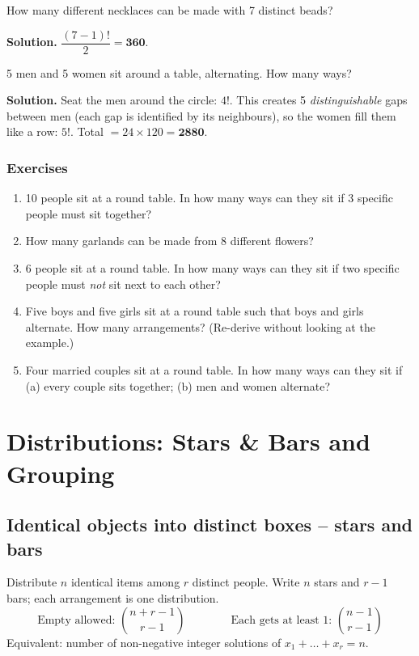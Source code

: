 \documentclass[11pt,a4paper,openany]{report}
\newenvironment{exercises}{\subsection*{Exercises \thechapter}\begin{enumerate}[label=\textbf{\thechapter.\arabic*},leftmargin=3.2em]}{\end{enumerate}}
\newcommand{\C}[2]{\binom{#1}{#2}}
\begin{document}
\begin{example}
How many different necklaces can be made with 7 distinct beads?

\textbf{Solution.} $\dfrac{(7-1)!}{2}=\mathbf{360}$.
\end{example}

\begin{example}[alternating]
5 men and 5 women sit around a table, alternating. How many ways?

\textbf{Solution.} Seat the men around the circle: $4!$. This creates 5 \emph{distinguishable} gaps between
men (each gap is identified by its neighbours), so the women fill them like a row: $5!$.
Total $=24\times120=\mathbf{2880}$.
\end{example}

\begin{exercises}
\item 10 people sit at a round table. In how many ways can they sit if 3 specific people must sit together?
\item How many garlands can be made from 8 different flowers?
\item 6 people sit at a round table. In how many ways can they sit if two specific people must \emph{not} sit next to each other?
\item Five boys and five girls sit at a round table such that boys and girls alternate. How many arrangements? (Re-derive without looking at the example.)
\item Four married couples sit at a round table. In how many ways can they sit if (a) every couple sits together; (b) men and women alternate?
\end{exercises}

\chapter{Distributions: Stars \& Bars and Grouping}\label{ch:dist}

\section{Identical objects into distinct boxes -- stars and bars}
Distribute $n$ identical items among $r$ distinct people. Write $n$ stars and $r-1$ bars;
each arrangement is one distribution.
\[
\text{Empty allowed: } \C{n+r-1}{r-1} \qquad\qquad
\text{Each gets at least 1: } \C{n-1}{r-1}
\]
Equivalent: number of non-negative integer solutions of $x_1+\dots+x_r=n$.
\end{document}
